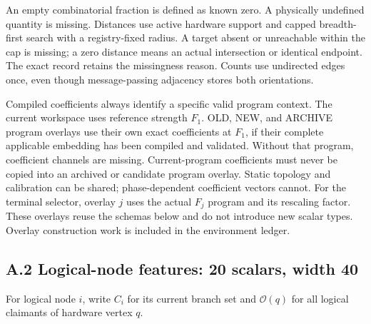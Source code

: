 \documentclass[10pt,a4paper]{article}
\begin{document}
An empty combinatorial fraction is defined as known zero. A physically
undefined quantity is missing. Distances use active hardware support and
capped breadth-first search with a registry-fixed radius. A target
absent or unreachable within the cap is missing; a zero distance means
an actual intersection or identical endpoint. The exact record retains
the missingness reason. Counts use undirected edges once, even though
message-passing adjacency stores both orientations.

Compiled coefficients always identify a specific valid program context.
The current workspace uses reference strength \(F_1\). OLD, NEW, and
ARCHIVE program overlays use their own exact coefficients at \(F_1\), if
their complete applicable embedding has been compiled and validated.
Without that program, coefficient channels are missing. Current-program
coefficients must never be copied into an archived or candidate program
overlay. Static topology and calibration can be shared; phase-dependent
coefficient vectors cannot. For the terminal selector, overlay \(j\)
uses the actual \(F_j\) program and its rescaling factor. These overlays
reuse the schemas below and do not introduce new scalar types. Overlay
construction work is included in the environment ledger.

\hypertarget{a.2-logical-node-features-20-scalars-width-40}{%
\subsection*{A.2 Logical-node features: 20 scalars, width
40}\label{a.2-logical-node-features-20-scalars-width-40}}

For logical node \(i\), write \(C_i\) for its current branch set and
\(\mathcal O(q)\) for all logical claimants of hardware vertex \(q\).

\begingroup\small
\end{document}

